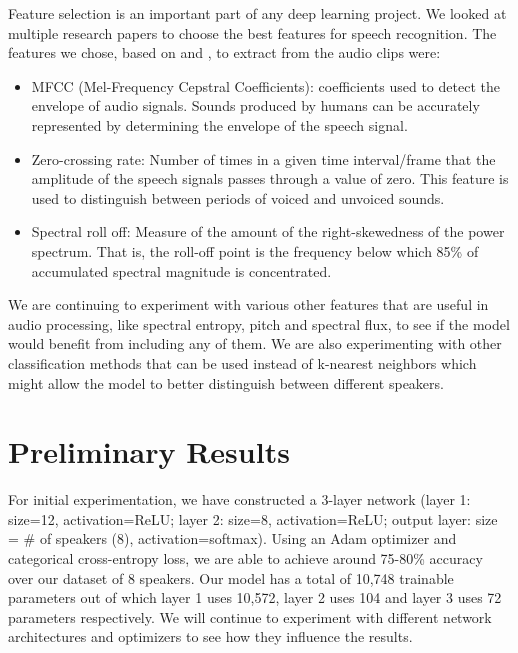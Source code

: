 \documentclass[10pt,twocolumn,letterpaper]{article}
\begin{document}
Feature selection is an important part of any deep learning project. We looked at multiple research papers to choose the best features for speech recognition. The features we chose, based on \cite{Sharma} and \cite{Author}, to extract from the audio clips were:

\begin{itemize}
    \item MFCC (Mel-Frequency Cepstral Coefficients): coefficients used to detect the envelope of audio signals. Sounds produced by humans can be accurately represented by determining the envelope of the speech signal.
    \item Zero-crossing rate: Number of times in a given time interval/frame that the amplitude of the speech signals passes through a value of zero. This feature is used to distinguish between periods of voiced and unvoiced sounds.
    \item Spectral roll off: Measure of the amount of the right-skewedness of the power spectrum. That is, the roll-off point is the frequency below which 85\% of accumulated spectral magnitude is concentrated.
\end{itemize}

We are continuing to experiment with various other features that are useful in audio processing, like spectral entropy, pitch and spectral flux, to see if the model would benefit from including any of them. We are also experimenting with other classification methods that can be used instead of k-nearest neighbors which might allow the model to better distinguish between different speakers.



\section{Preliminary Results}

For initial experimentation, we have constructed a 3-layer network (layer 1: size=12, activation=ReLU; layer 2: size=8, activation=ReLU; output layer: size = \# of speakers (8), activation=softmax). Using an Adam optimizer and categorical cross-entropy loss, we are able to achieve around 75-80\% accuracy over our dataset of 8 speakers. Our model has a total of 10,748 trainable parameters out of which layer 1 uses 10,572, layer 2 uses 104 and layer 3 uses 72 parameters respectively. We will continue to experiment with different network architectures and optimizers to see how they influence the results. 
\end{document}
